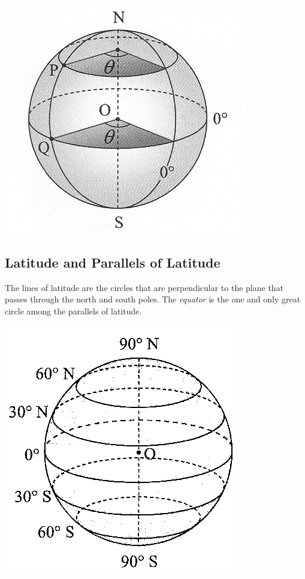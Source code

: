 \documentclass{report}
\begin{document}
\begin{multicols}{2}
    \begin{center}
        \includegraphics[scale=1.4]{longitude.png}
    \end{center}

    \subsection*{Latitude and Parallels of Latitude}

    The lines of latitude are the circles that are perpendicular to the plane that
    passes through the north and south poles. The \emph{equator} is the one and
    only great circle among the parallels of latitude.

    \begin{center}
        \includegraphics[scale=1.3]{latitude}
    \end{center}


\end{multicols}
\end{document}
